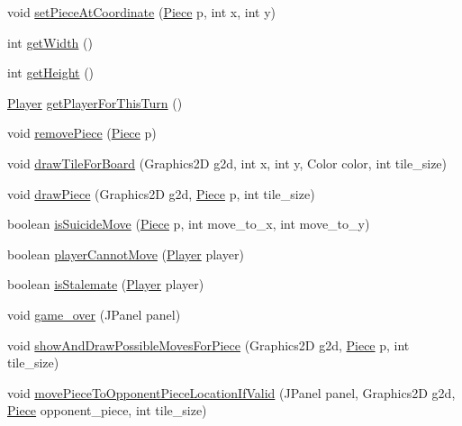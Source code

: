 \begin{DoxyCompactItemize}
void \hyperlink{classchess_1_1_chess_board_ae9d535deacab87c0de3ee10c8b8868f4}{set\+Piece\+At\+Coordinate} (\hyperlink{classpiece_1_1_piece}{Piece} p, int x, int y)
\item 
int \hyperlink{classchess_1_1_chess_board_a29781b412843a9db6c65adbaed0a5c07}{get\+Width} ()
\item 
int \hyperlink{classchess_1_1_chess_board_aae882150e2ecfda4defceabadff016c3}{get\+Height} ()
\item 
\hyperlink{enumchess_1_1_player}{Player} \hyperlink{classchess_1_1_chess_board_ae6fe2b06940fa56971e174e01fa22df1}{get\+Player\+For\+This\+Turn} ()
\item 
void \hyperlink{classchess_1_1_chess_board_af2f8678df1f61c42e6abb2591716451a}{remove\+Piece} (\hyperlink{classpiece_1_1_piece}{Piece} p)
\item 
void \hyperlink{classchess_1_1_chess_board_a1511b7e9055bbc9daff70f294bff92bc}{draw\+Tile\+For\+Board} (Graphics2\+D g2d, int x, int y, Color color, int tile\+\_\+size)
\item 
void \hyperlink{classchess_1_1_chess_board_a879f102e91c76d41ef78ccabf1174046}{draw\+Piece} (Graphics2\+D g2d, \hyperlink{classpiece_1_1_piece}{Piece} p, int tile\+\_\+size)
\item 
boolean \hyperlink{classchess_1_1_chess_board_a9afd8643586328685ca7bcbcf1cec4a4}{is\+Suicide\+Move} (\hyperlink{classpiece_1_1_piece}{Piece} p, int move\+\_\+to\+\_\+x, int move\+\_\+to\+\_\+y)
\item 
boolean \hyperlink{classchess_1_1_chess_board_a1eef0b88f595b1501b2d12ab5e373e6f}{player\+Cannot\+Move} (\hyperlink{enumchess_1_1_player}{Player} player)
\item 
boolean \hyperlink{classchess_1_1_chess_board_ae8b13d31ee134f4365bc051b6178b2b5}{is\+Stalemate} (\hyperlink{enumchess_1_1_player}{Player} player)
\item 
void \hyperlink{classchess_1_1_chess_board_a81c34b69d1ab11b82272beb72bdb3555}{game\+\_\+over} (J\+Panel panel)
\item 
void \hyperlink{classchess_1_1_chess_board_aa85109bb8788435e3dfedcde5a32af6f}{show\+And\+Draw\+Possible\+Moves\+For\+Piece} (Graphics2\+D g2d, \hyperlink{classpiece_1_1_piece}{Piece} p, int tile\+\_\+size)
\item 
void \hyperlink{classchess_1_1_chess_board_ad0d122018033f24e0c4b3e58778730f9}{move\+Piece\+To\+Opponent\+Piece\+Location\+If\+Valid} (J\+Panel panel, Graphics2\+D g2d, \hyperlink{classpiece_1_1_piece}{Piece} opponent\+\_\+piece, int tile\+\_\+size)
\item 

\end{DoxyCompactItemize}
